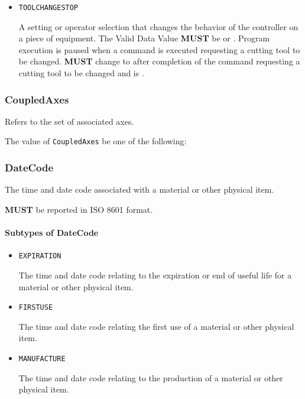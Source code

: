 \begin{itemize}
\item \texttt{TOOL\textunderscore CHANGE\textunderscore STOP}


A setting or operator selection that changes the behavior of the controller on a piece of equipment. 
 The \gls{Valid Data Value} \textbf{MUST} be  or . 
 Program execution is paused when a command is executed requesting a cutting tool to be changed. 
  \textbf{MUST} change to  after completion of the command requesting a cutting tool to be changed and  is .


\end{itemize}

\subsubsection{CoupledAxes}
\label{sec:CoupledAxes}



Refers to the set of associated axes.


The value of \texttt{CoupledAxes} \MUST be one of the following: 

\FloatBarrier

\subsubsection{DateCode}
\label{sec:DateCode}



The time and date code associated with a material or other physical item.
  
  \textbf{MUST} be reported in ISO 8601 format.


\paragraph{Subtypes of DateCode}\mbox{}
\label{sec:Subtypes of DateCode}

\begin{itemize}

\item \texttt{EXPIRATION}


The time and date code relating to the expiration or end of useful life for a material or other physical item.

\item \texttt{FIRST\textunderscore USE}


The time and date code relating the first use of a material or other physical item.

\item \texttt{MANUFACTURE}


The time and date code relating to the production of a material or other physical item.


\end{itemize}

